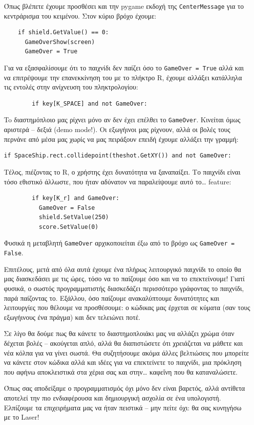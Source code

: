 Όπως βλέπετε έχουμε προσθέσει και την pygame εκδοχή της {\tt CenterMessage} για το κεντράρισμα του κειμένου. Στον κύριο βρόχο έχουμε:

\begin{verbatim}
    if shield.GetValue() == 0:
      GameOverShow(screen)
      GameOver = True
\end{verbatim}

Για να εξασφαλίσουμε ότι το παιχνίδι δεν παίζει όσο το {\tt GameOver = True} αλλά και να επιτρέψουμε την επανεκκίνηση του με το πλήκτρο R, έχουμε αλλάξει κατάλληλα τις εντολές στην ανίχνευση του πληκτρολογίου:

\begin{verbatim}
        if key[K_SPACE] and not GameOver:
\end{verbatim}

To διαστημόπλοιο μας ρίχνει μόνο αν δεν έχει επέλθει το {\tt GameOver}. Κινείται όμως αριστερά -- δεξιά (demo mode!). Οι εξωγήινοι μας ρίχνουν, αλλά οι βολές τους περνάνε από μέσα μας χωρίς να μας πειράξουν επειδή έχουμε αλλάξει την γραμμή:

\begin{verbatim}
if SpaceShip.rect.collidepoint(theshot.GetXY()) and not GameOver:
\end{verbatim}

Τέλος, πιέζοντας το R, ο χρήστης έχει δυνατότητα να ξαναπαίξει. Το παιχνίδι είναι τόσο εθιστικό άλλωστε, που ήταν αδύνατον να παραλείψουμε αυτό το\ldots{} feature:

\begin{verbatim}
        if key[K_r] and GameOver:
          GameOver = False
          shield.SetValue(250)
          score.SetValue(0)
\end{verbatim}

Φυσικά η μεταβλητή {\tt GameOver} αρχικοποιείται έξω από το βρόχο ως {\tt GameOver = False}.

Επιτέλους, μετά από όλα αυτά έχουμε ένα πλήρως λειτουργικό παιχνίδι το οποίο θα μας διασκεδάσει με τις ώρες, τόσο να το παίζουμε όσο και να το επεκτείνουμε! Γιατί φυσικά, ο σωστός προγραμματιστής διασκεδάζει περισσότερο γράφοντας το παιχνίδι, παρά παίζοντας το. Εξάλλου, όσο παίζουμε ανακαλύπτουμε δυνατότητες και λειτουργίες που θέλουμε να προσθέσουμε: ο κώδικας μας έρχεται σε κύματα (σαν τους εξωγήινους ένα πράγμα) και δεν τελειώνει ποτέ.

Σε λίγο θα δούμε πως θα κάνετε το διαστημοπλοιάκι μας να αλλάζει χρώμα όταν δέχεται βολές -- ακούγεται απλό, αλλά θα διαπιστώσετε ότι χρειάζεται να μάθετε και νέα κόλπα για να γίνει σωστά. Θα συζητήσουμε ακόμα άλλες βελτιώσεις που μπορείτε να κάνετε στον κώδικα αλλά και ιδέες για να επεκτείνετε το παιχνίδι, μια πρόκληση που αφήνω αποκλειστικά στα χέρια σας και στην\ldots{} καφεΐνη που θα καταναλώσετε.

Όπως σας αποδείξαμε ο προγραμματισμός όχι μόνο δεν είναι βαρετός, αλλά αντίθετα αποτελεί την πιο ενδιαφέρουσα και δημιουργική ασχολία σε ένα υπολογιστή. Ελπίζουμε τα επιχειρήματα μας να ήταν πειστικά -- μην πείτε όχι: θα σας κυνηγήσω με το Laser!
